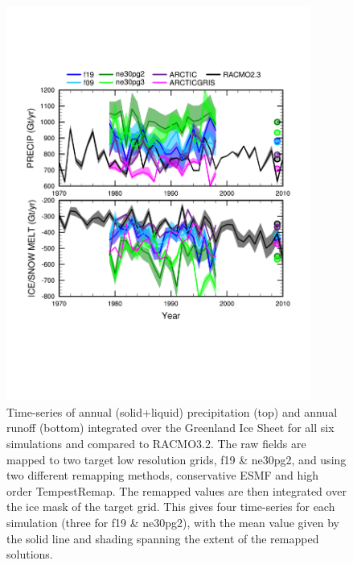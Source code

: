 \documentclass[draft]{agujournal2019}
\begin{document}
\begin{figure}[t]
\begin{center}
         \includegraphics[width=100mm]{figs/temp_tseries_GRIS.pdf}
\end{center}
\caption{Time-series of annual (solid+liquid) precipitation (top) and annual runoff (bottom) integrated over the Greenland Ice Sheet for all six simulations and compared to RACMO3.2. The raw fields are mapped to two target low resolution grids, f19 \& ne30pg2, and using two different remapping methods, conservative ESMF and high order TempestRemap. The remapped values are then integrated over the ice mask of the target grid. This gives four time-series for each simulation (three for f19 \& ne30pg2), with the mean value given by the solid line and shading spanning the extent of the remapped solutions.}
\label{fig:tseries}
\end{figure}

\end{document}
